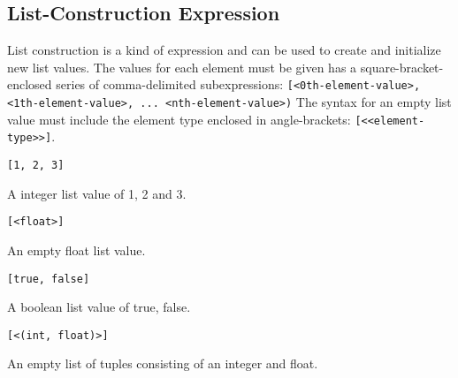 
\subsection{List-Construction Expression}
{
	List construction is a kind of expression and can be
	used to create and initialize new list values.
	The values for each element must be given has a square-bracket-enclosed
	series of comma-delimited
	subexpressions: \texttt{[<0th-element-value>, <1th-element-value>, ... <nth-element-value>)}
	The syntax for an empty list value must include the element type enclosed
	in angle-brackets: \texttt{[<<element-type>>]}.
	
	\begin{itemize}
	{
		\item \texttt{[1, 2, 3]}
		
			A integer list value of 1, 2 and 3.
		
		\item \texttt{[<float>]}
		
			An empty float list value.
		
		\item \texttt{[true, false]}
		
			A boolean list value of true, false.
		
		\item \texttt{[<(int, float)>]}
		
			An empty list of tuples consisting of an integer and float.
	}
	\end{itemize}
}
